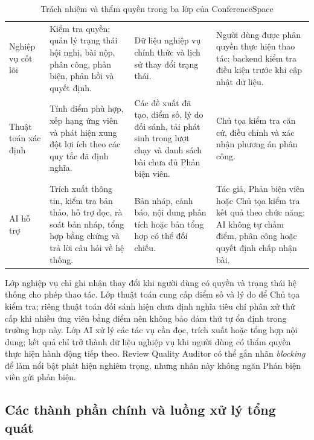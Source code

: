 \begin{table}[H]
  \centering
  \caption{Trách nhiệm và thẩm quyền trong ba lớp của ConferenceSpace}
  \label{tab:ch3-responsibility-layers}
  \setlength{\tabcolsep}{2.5pt}
  \renewcommand{\arraystretch}{1.15}
  \begin{tabularx}{\textwidth}{|P{0.16\textwidth}|Y|Y|Y|}
    \hline
     &  &  &  \\ \hline
    Nghiệp vụ cốt lõi & Kiểm tra quyền; quản lý trạng thái hội nghị, bài nộp, phân công, phản biện, phản hồi và quyết định. & Dữ liệu nghiệp vụ chính thức và lịch sử thay đổi trạng thái. & Người dùng được phân quyền thực hiện thao tác; backend kiểm tra điều kiện trước khi cập nhật dữ liệu. \\ \hline
    Thuật toán xác định & Tính điểm phù hợp, xếp hạng ứng viên và phát hiện xung đột lợi ích theo các quy tắc đã định nghĩa. & Các đề xuất đã tạo, điểm số, lý do đối sánh, tải phát sinh trong lượt chạy và danh sách bài chưa đủ Phản biện viên. & Chủ tọa kiểm tra căn cứ, điều chỉnh và xác nhận phương án phân công. \\ \hline
    AI hỗ trợ & Trích xuất thông tin, kiểm tra bản thảo, hỗ trợ đọc, rà soát bản nháp, tổng hợp bằng chứng và trả lời câu hỏi về hệ thống. & Bản nháp, cảnh báo, nội dung phân tích hoặc bản tổng hợp có thể đối chiếu. & Tác giả, Phản biện viên hoặc Chủ tọa kiểm tra kết quả theo chức năng; AI không tự chấm điểm, phân công hoặc quyết định chấp nhận bài. \\ \hline
  \end{tabularx}
\end{table}

Lớp nghiệp vụ chỉ ghi nhận thay đổi khi người dùng có quyền và trạng thái hệ thống cho phép thao tác. Lớp thuật toán cung cấp điểm số và lý do để Chủ tọa kiểm tra; riêng thuật toán đối sánh hiện chưa định nghĩa tiêu chí phân xử thứ cấp khi nhiều ứng viên bằng điểm nên không bảo đảm thứ tự ổn định trong trường hợp này. Lớp AI xử lý các tác vụ cần đọc, trích xuất hoặc tổng hợp nội dung; kết quả chỉ trở thành dữ liệu nghiệp vụ khi người dùng có thẩm quyền thực hiện hành động tiếp theo. Review Quality Auditor có thể gắn nhãn \textit{blocking} để làm nổi bật phát hiện nghiêm trọng, nhưng nhãn này không ngăn Phản biện viên gửi phản biện.

\subsection{Các thành phần chính và luồng xử lý tổng quát}

